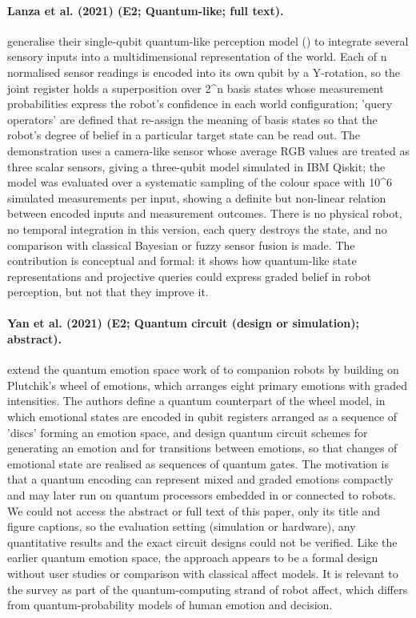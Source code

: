 \documentclass[10pt,a4paper]{article}
\begin{document}
\paragraph{Lanza et al. (2021) (E2; Quantum-like; full text).} \citet{Lanza2021} generalise their single-qubit quantum-like perception model (\citep{Lanza2020}) to integrate several sensory inputs into a multidimensional representation of the world. Each of n normalised sensor readings is encoded into its own qubit by a Y-rotation, so the joint register holds a superposition over 2\^{}n basis states whose measurement probabilities express the robot's confidence in each world configuration; 'query operators' are defined that re-assign the meaning of basis states so that the robot's degree of belief in a particular target state can be read out. The demonstration uses a camera-like sensor whose average RGB values are treated as three scalar sensors, giving a three-qubit model simulated in IBM Qiskit; the model was evaluated over a systematic sampling of the colour space with 10\^{}6 simulated measurements per input, showing a definite but non-linear relation between encoded inputs and measurement outcomes. There is no physical robot, no temporal integration in this version, each query destroys the state, and no comparison with classical Bayesian or fuzzy sensor fusion is made. The contribution is conceptual and formal: it shows how quantum-like state representations and projective queries could express graded belief in robot perception, but not that they improve it.

\paragraph{Yan et al. (2021) (E2; Quantum circuit (design or simulation); abstract).} \citet{Yan2021c} extend the quantum emotion space work of \citep{Yan2019} to companion robots by building on Plutchik's wheel of emotions, which arranges eight primary emotions with graded intensities. The authors define a quantum counterpart of the wheel model, in which emotional states are encoded in qubit registers arranged as a sequence of 'discs' forming an emotion space, and design quantum circuit schemes for generating an emotion and for transitions between emotions, so that changes of emotional state are realised as sequences of quantum gates. The motivation is that a quantum encoding can represent mixed and graded emotions compactly and may later run on quantum processors embedded in or connected to robots. We could not access the abstract or full text of this paper, only its title and figure captions, so the evaluation setting (simulation or hardware), any quantitative results and the exact circuit designs could not be verified. Like the earlier quantum emotion space, the approach appears to be a formal design without user studies or comparison with classical affect models. It is relevant to the survey as part of the quantum-computing strand of robot affect, which differs from quantum-probability models of human emotion and decision.
\end{document}
